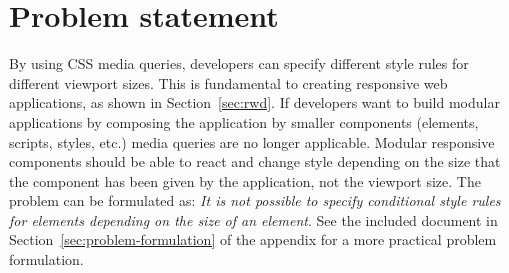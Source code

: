 \documentclass[a4paper,11pt]{kth-mag}
\begin{document}
    \section{Problem statement}\label{sec:problem}
      By using \gls{CSS} \gls{media queries}, developers can specify different style rules for different \gls{viewport} sizes.
      This is fundamental to creating \gls{responsive} \gls{web} applications, as shown in Section~\ref{sec:rwd}.
      If developers want to build modular applications by composing the application by smaller components (\glspl{element}, scripts, styles, etc.) \gls{media queries} are no longer applicable.
      Modular \gls{responsive} components should be able to react and change style depending on the size that the component has been given by the application, not the \gls{viewport} size. 
      The problem can be formulated as: \emph{It is not possible to specify conditional style rules for \glspl{element} depending on the size of an element}.
      See the included document in Section~\ref{sec:problem-formulation} of the appendix for a more practical problem formulation.
\end{document}
